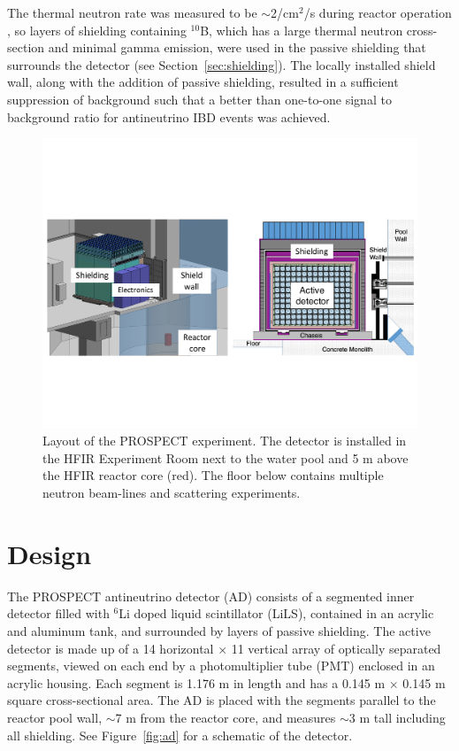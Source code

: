 The thermal neutron rate was measured to be $\sim$2/cm$^2$/s during reactor operation \cite{Ashenfelter:2015tpm}, so layers of shielding containing $^{10}$B, which has a large thermal neutron cross-section and minimal gamma emission, were used in the passive shielding that surrounds the detector (see Section~\ref{sec:shielding}). 
The locally installed shield wall, along with the addition of passive shielding, resulted in a sufficient suppression of background such that a better than one-to-one signal to background ratio for antineutrino IBD events was achieved. 

\begin{figure}[t]
	\centering
	\includegraphics[width=0.5\linewidth]{tex/4-prospect-images/Shielding}
	\caption[Layout of PROSPECT at HFIR]{Layout of the PROSPECT experiment. The detector is installed in the HFIR Experiment Room next to the water pool and 5 m above the HFIR reactor core (red). The floor below contains multiple neutron beam-lines and scattering experiments.}
	\label{fig:shielding}
\end{figure}

\section{Design}

The PROSPECT antineutrino detector (AD) consists of a segmented inner detector filled with $^6$Li doped liquid scintillator (LiLS), contained in an acrylic and aluminum tank, and surrounded by layers of passive shielding. 
The active detector is made up of a 14 horizontal $\times$ 11 vertical array of optically separated segments, viewed on each end by a photomultiplier tube (PMT) enclosed in an acrylic housing. 
Each segment is 1.176 m in length and has a 0.145 m $\times$ 0.145 m square cross-sectional area.
The AD is placed with the segments parallel to the reactor pool wall, $\sim$7 m from the reactor core, and measures $\sim$3 m tall including all shielding. 
See Figure~\ref{fig:ad} for a schematic of the detector. 

